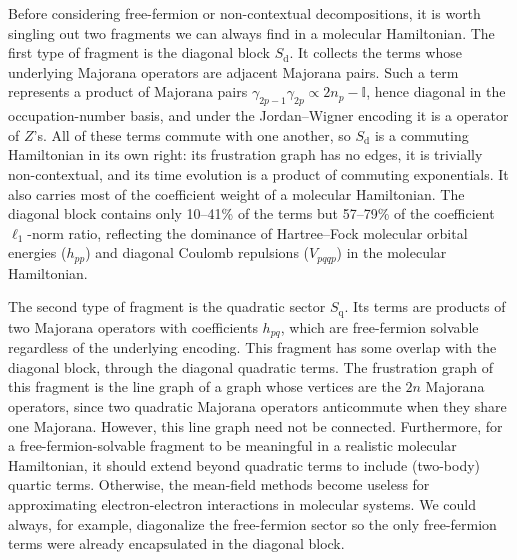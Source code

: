 \documentclass[%
 aip,
 amsmath,amssymb,
 reprint,%
]{revtex4-1}
\newcommand{\Id}{\mathbb{I}}       %
\newcommand{\pool}{S}                    %
\newcommand{\subdiag}{\mathrm{d}}        %
\newcommand{\subquad}{\mathrm{q}}        %
\newcommand{\pooldiag}{\pool_{\subdiag}} %
\newcommand{\poolquad}{\pool_{\subquad}} %
\begin{document}
Before considering free-fermion or non-contextual decompositions, it is worth singling out two fragments we can always find in a molecular Hamiltonian. The first type of fragment is the diagonal block $\pooldiag$. It collects the terms whose underlying Majorana operators are adjacent Majorana pairs. Such a term represents a product of Majorana pairs $\gamma_{2p-1}\gamma_{2p}\propto 2n_p-\Id$, hence diagonal in the occupation-number basis, and under the Jordan--Wigner encoding it is a operator of $Z$'s. All of these terms commute with one another, so $\pooldiag$ is a commuting Hamiltonian in its own right: its frustration graph has no edges, it is trivially non-contextual, and its time evolution is a product of commuting exponentials. It also carries most of the coefficient weight of a molecular Hamiltonian. The diagonal block contains only 10--41\% of the terms but 57--79\% of the coefficient $\ell_1$-norm ratio, reflecting the dominance of Hartree--Fock molecular orbital energies ($h_{pp}$) and diagonal Coulomb repulsions ($V_{pqqp}$) in the molecular Hamiltonian.

The second type of fragment is the quadratic sector $\poolquad$. Its terms are products of two Majorana operators with coefficients $h_{pq}$, which are free-fermion solvable regardless of the underlying encoding. This fragment has some overlap with the diagonal block, through the diagonal quadratic terms. The frustration graph of this fragment is the line graph of a graph whose vertices are the $2n$ Majorana operators, since two quadratic Majorana operators anticommute when they share one Majorana. However, this line graph need not be connected. 
Furthermore, for a free-fermion-solvable fragment to be meaningful in a realistic molecular Hamiltonian, it should extend beyond quadratic terms to include (two-body) quartic terms. Otherwise, the mean-field methods become useless for approximating electron-electron interactions in molecular systems. We could always, for example, diagonalize the free-fermion sector so the only free-fermion terms were already encapsulated in the diagonal block. 
\end{document}
